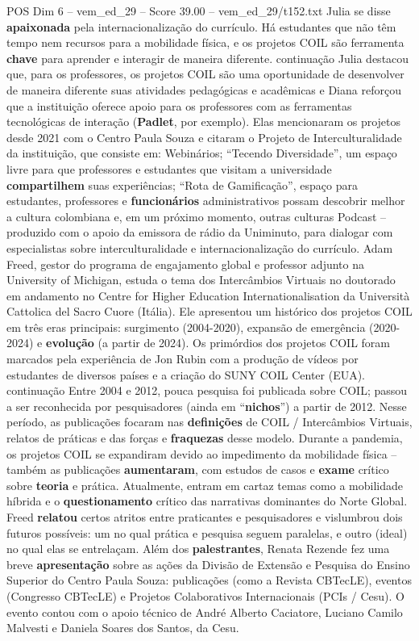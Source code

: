 \begin{textsample}{POS Dim 6 – vem\_ed\_29 – Score 39.00 – vem\_ed\_29/t152.txt}
Julia se disse \textbf{apaixonada} pela internacionalização do currículo.
Há estudantes que não têm tempo nem recursos para a mobilidade física, e os projetos COIL são ferramenta \textbf{chave} para aprender e interagir de maneira diferente. continuação Julia destacou que, para os professores, os projetos COIL são uma oportunidade de desenvolver de maneira diferente suas atividades pedagógicas e acadêmicas e Diana reforçou que a instituição oferece apoio para os professores com as ferramentas tecnológicas de interação (\textbf{Padlet}, por exemplo).
Elas mencionaram os projetos desde 2021 com o Centro Paula Souza e citaram o Projeto de Interculturalidade da instituição, que consiste em: Webinários; “Tecendo Diversidade”, um espaço livre para que professores e estudantes que visitam a universidade \textbf{compartilhem} suas experiências; “Rota de Gamificação”, espaço para estudantes, professores e \textbf{funcionários} administrativos possam descobrir melhor a cultura colombiana e, em um próximo momento, outras culturas Podcast – produzido com o apoio da emissora de rádio da Uniminuto, para dialogar com especialistas sobre interculturalidade e internacionalização do currículo.
Adam Freed, gestor do programa de engajamento global e professor adjunto na University of Michigan, estuda o tema dos Intercâmbios Virtuais no doutorado em andamento no Centre for Higher Education Internationalisation da Università Cattolica del Sacro Cuore (Itália).
Ele apresentou um histórico dos projetos COIL em três eras principais: surgimento (2004-2020), expansão de emergência (2020-2024) e \textbf{evolução} (a partir de 2024).
Os primórdios dos projetos COIL foram marcados pela experiência de Jon Rubin com a produção de vídeos por estudantes de diversos países e a criação do SUNY COIL Center (EUA). continuação Entre 2004 e 2012, pouca pesquisa foi publicada sobre COIL; passou a ser reconhecida por pesquisadores (ainda em “\textbf{nichos}”) a partir de 2012.
Nesse período, as publicações focaram nas \textbf{definições} de COIL / Intercâmbios Virtuais, relatos de práticas e das forças e \textbf{fraquezas} desse modelo.
Durante a pandemia, os projetos COIL se expandiram devido ao impedimento da mobilidade física – também as publicações \textbf{aumentaram}, com estudos de casos e \textbf{exame} crítico sobre \textbf{teoria} e prática.
Atualmente, entram em cartaz temas como a mobilidade híbrida e o \textbf{questionamento} crítico das narrativas dominantes do Norte Global.
Freed \textbf{relatou} certos atritos entre praticantes e pesquisadores e vislumbrou dois futuros possíveis: um no qual prática e pesquisa seguem paralelas, e outro (ideal) no qual elas se entrelaçam.
Além dos \textbf{palestrantes}, Renata Rezende fez uma breve \textbf{apresentação} sobre as ações da Divisão de Extensão e Pesquisa do Ensino Superior do Centro Paula Souza: publicações (como a Revista CBTecLE), eventos (Congresso CBTecLE) e Projetos Colaborativos Internacionais (PCIs / Cesu).
O evento contou com o apoio técnico de André Alberto Caciatore, Luciano Camilo Malvesti e Daniela Soares dos Santos, da Cesu.


\end{textsample}
